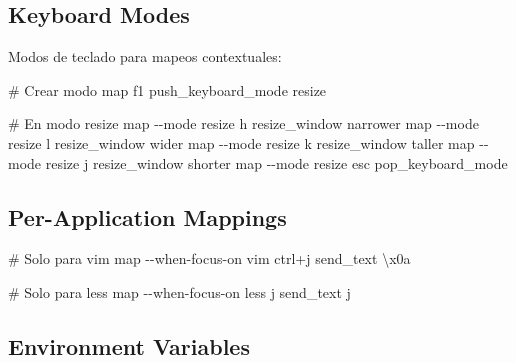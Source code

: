 \documentclass[
  doc,
  floatsintext,
  longtable,
  a4paper,
  nolmodern,
  notxfonts,
  notimes,
  12pt,
  colorlinks=true,linkcolor=blue,citecolor=blue,urlcolor=blue]{apa7}
\newenvironment{Shaded}{\begin{snugshade}}{\end{snugshade}}
\newcommand{\CommentTok}[1]{\textcolor[rgb]{0.37,0.37,0.37}{#1}}
\newcommand{\DataTypeTok}[1]{\textcolor[rgb]{0.68,0.00,0.00}{#1}}
\newcommand{\ErrorTok}[1]{\textcolor[rgb]{0.68,0.00,0.00}{#1}}
\begin{document}
\subsection{Keyboard Modes}\label{keyboard-modes}

Modos de teclado para mapeos contextuales:

\begin{Shaded}
\begin{Highlighting}[]
\CommentTok{\# Crear modo}
\DataTypeTok{map} \DataTypeTok{f1} \DataTypeTok{push\_keyboard\_mode} \DataTypeTok{resize}

\CommentTok{\# En modo resize}
\DataTypeTok{map} \DataTypeTok{{-}{-}mode} \DataTypeTok{resize} \DataTypeTok{h} \DataTypeTok{resize\_window} \DataTypeTok{narrower}
\DataTypeTok{map} \DataTypeTok{{-}{-}mode} \DataTypeTok{resize} \DataTypeTok{l} \DataTypeTok{resize\_window} \DataTypeTok{wider}
\DataTypeTok{map} \DataTypeTok{{-}{-}mode} \DataTypeTok{resize} \DataTypeTok{k} \DataTypeTok{resize\_window} \DataTypeTok{taller}
\DataTypeTok{map} \DataTypeTok{{-}{-}mode} \DataTypeTok{resize} \DataTypeTok{j} \DataTypeTok{resize\_window} \DataTypeTok{shorter}
\DataTypeTok{map} \DataTypeTok{{-}{-}mode} \DataTypeTok{resize} \DataTypeTok{esc} \DataTypeTok{pop\_keyboard\_mode}
\end{Highlighting}
\end{Shaded}

\subsection{Per-Application Mappings}\label{per-application-mappings}

\begin{Shaded}
\begin{Highlighting}[]
\CommentTok{\# Solo para vim}
\DataTypeTok{map} \DataTypeTok{{-}{-}when{-}focus{-}on} \DataTypeTok{vim} \DataTypeTok{ctrl}\ErrorTok{+}\DataTypeTok{j} \DataTypeTok{send\_text} \ErrorTok{\textbackslash{}}\DataTypeTok{x0a}

\CommentTok{\# Solo para less}
\DataTypeTok{map} \DataTypeTok{{-}{-}when{-}focus{-}on} \DataTypeTok{less} \DataTypeTok{j} \DataTypeTok{send\_text} \DataTypeTok{j}
\end{Highlighting}
\end{Shaded}

\subsection{Environment Variables}\label{environment-variables}
\end{document}
